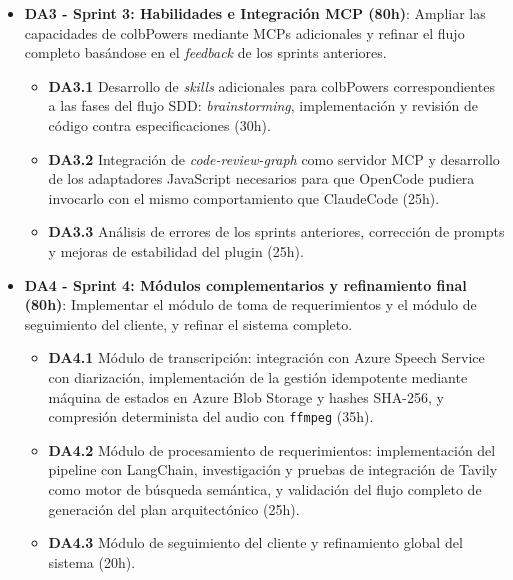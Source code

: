 \documentclass[11pt, letterpaper]{article}
\begin{document}
\begin{itemize}
    \item \textbf{DA3 - Sprint 3: Habilidades e Integración MCP (80h)}: Ampliar las capacidades de colbPowers mediante MCPs adicionales y refinar el flujo completo basándose en el \textit{feedback} de los sprints anteriores.
    \begin{itemize}
        \item \textbf{DA3.1} Desarrollo de \textit{skills} adicionales para colbPowers correspondientes a las fases del flujo SDD: \textit{brainstorming}, implementación y revisión de código contra especificaciones (30h).
        \item \textbf{DA3.2} Integración de \textit{code-review-graph} como servidor MCP y desarrollo de los adaptadores JavaScript necesarios para que OpenCode pudiera invocarlo con el mismo comportamiento que ClaudeCode (25h).
        \item \textbf{DA3.3} Análisis de errores de los sprints anteriores, corrección de prompts y mejoras de estabilidad del plugin (25h).
    \end{itemize}

    \item \textbf{DA4 - Sprint 4: Módulos complementarios y refinamiento final (80h)}: Implementar el módulo de toma de requerimientos y el módulo de seguimiento del cliente, y refinar el sistema completo.
    \begin{itemize}
        \item \textbf{DA4.1} Módulo de transcripción: integración con Azure Speech Service con diarización, implementación de la gestión idempotente mediante máquina de estados en Azure Blob Storage y hashes SHA-256, y compresión determinista del audio con \texttt{ffmpeg} (35h).
        \item \textbf{DA4.2} Módulo de procesamiento de requerimientos: implementación del pipeline con LangChain, investigación y pruebas de integración de Tavily como motor de búsqueda semántica, y validación del flujo completo de generación del plan arquitectónico (25h).
        \item \textbf{DA4.3} Módulo de seguimiento del cliente y refinamiento global del sistema (20h).
    \end{itemize}
\end{itemize}
\end{document}
